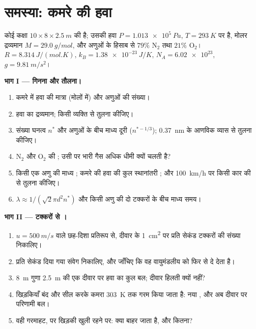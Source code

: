 \section{समस्या: कमरे की हवा}

\begin{problem}
\label{pb:b1:kinetic-theory:1}
कोई कक्षा $10 \times 8 \times \qty{2.5}{m}$ की है; उसकी हवा
$P = \qty{1.013e5}{Pa}$, $T = \qty{293}{K}$ पर है, मोलर द्रव्यमान $M = \qty{29.0}{g/mol}$,
और अणुओं के हिसाब से $79\%$ N$_2$ तथा $21\%$ O$_2$। $R = \qty{8.314}{J/(mol.K)}$,
$k_B = \qty{1.38e-23}{J/K}$, $N_A = \num{6.02e23}$, $g = \qty{9.81}{m/s^2}$।

\medskip
\noindent\textbf{भाग I --- गिनना और तौलना।}
\begin{enumerate}
  \item कमरे में हवा की मात्रा (मोलों में) और अणुओं की संख्या।
  \item हवा का द्रव्यमान; किसी व्यक्ति से तुलना कीजिए।
  \item संख्या घनत्व $n^*$ और अणुओं के बीच माध्य दूरी
        ($n^{*-1/3}$); \qty{0.37}{nm} के आणविक व्यास से तुलना कीजिए।
  \item N$_2$ और O$_2$ की ; उसी  पर भारी गैस अधिक
        धीमी क्यों चलती है?
  \item किसी एक अणु की माध्य ; कमरे की हवा की कुल स्थानांतरी
        ; और \qty{100}{km/h} पर किसी कार की  से तुलना
        कीजिए।
  \item {} $\lambda \approx 1/(\sqrt2\pi d^2n^*)$ और किसी अणु
        की दो टक्करों के बीच माध्य समय।
\end{enumerate}

\medskip
\noindent\textbf{भाग II --- टक्करों से ।}
\begin{enumerate}[resume]
  \item $u = \qty{500}{m/s}$ वाले छह-दिशा प्रतिरूप से, दीवार के
        \qty{1}{cm^2} पर प्रति सेकंड टक्करों की संख्या निकालिए।
  \item प्रति सेकंड दिया गया संवेग निकालिए, और जाँचिए कि वह वायुमंडलीय
         को फिर से दे देता है।
  \item \qty{8}{m} गुणा \qty{2.5}{m} की एक दीवार पर हवा का कुल बल; दीवार
        हिलती क्यों नहीं?
  \item खिड़कियाँ बंद और सील करके कमरा \qty{303}{K} तक गरम किया जाता है:
        नया , और अब दीवार पर परिणामी बल।
  \item वही गरमाहट, पर खिड़की खुली रहने पर: क्या बाहर जाता है, और कितना?
\end{enumerate}


\end{problem}
